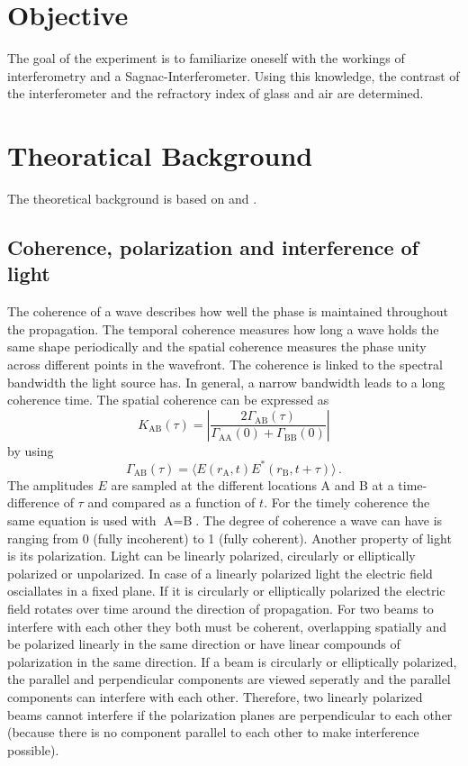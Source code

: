 \section{Objective}
\label{sec:Objective}
The goal of the experiment is to familiarize oneself with the workings of interferometry and a Sagnac-Interferometer. 
Using this knowledge, the contrast of the interferometer and the refractory index of glass and air are determined. 

\section{Theoratical Background}
\label{sec:Theorie}
The theoretical background is based on \cite{Optik} and \cite{anleitungV64}.
\subsection{Coherence, polarization and interference of light}
The coherence of a wave describes how well the phase is maintained throughout the propagation. The temporal coherence measures how long a 
wave holds the same shape periodically and the spatial coherence measures the phase unity across different points in the wavefront.
The coherence is linked to the spectral bandwidth the light source has. In general, a narrow bandwidth leads to a long coherence time.
 The spatial coherence can be expressed as 
\begin{equation*}
   K_{\text{AB}} (\tau) = \left| \frac{2\Gamma_{\text{AB}}(\tau)}{\Gamma_{\text{AA}}(0) + \Gamma_{\text{BB}}(0)} \right|
\end{equation*}
by using
\begin{equation*}
   \Gamma_{\text{AB}}(\tau) = \langle E(r_{\text{A}},t)E^{*}(r_{\text{B}},t + \tau) \rangle \, .
\end{equation*}
The amplitudes $E$ are sampled at the different locations A and B at a time-difference of $\tau$ and compared as a function of $t$. For the timely coherence the same equation is used with $\text{A} = \text{B}$.
The degree of coherence a wave can have is ranging from 0 (fully incoherent) to 1 (fully coherent).
Another property of light is its polarization. Light can be linearly polarized, circularly or elliptically polarized or unpolarized. 
In case of a linearly polarized light the electric field osciallates in a fixed plane. If it is circularly or elliptically polarized the 
electric field rotates over time around the direction of propagation. 
For two beams to interfere with each other they both must be coherent, overlapping spatially and be polarized linearly in the same direction or have
linear compounds of polarization in the same direction. If a beam is circularly or elliptically polarized, the parallel and perpendicular components are viewed seperatly and the parallel components can interfere with each other. Therefore, two linearly polarized beams cannot interfere if the polarization planes are perpendicular to each other (because there is no component parallel to each other to make interference possible). 

